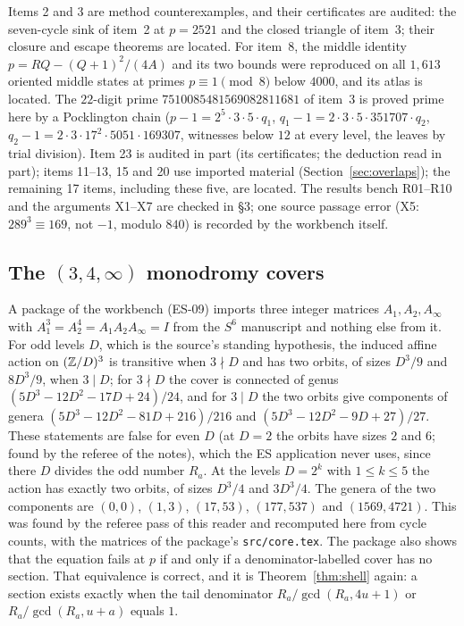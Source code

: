 Items 2 and 3 are method counterexamples, and their certificates are audited: the seven-cycle sink of item~2 at $p=2521$ and the closed triangle of item~3; their closure and escape theorems are located. For item~8, the middle identity $p=RQ-(Q+1)^2/(4A)$ and its two bounds were reproduced on all $1{,}613$ oriented middle states at primes $p\equiv1\pmod8$ below $4000$, and its atlas is located. The $22$-digit prime $7510085481569082811681$ of item~3 is proved prime here by a Pocklington chain ($p-1=2^5\cdot3\cdot5\cdot q_1$, $q_1-1=2\cdot3\cdot5\cdot351707\cdot q_2$, $q_2-1=2\cdot3\cdot17^2\cdot5051\cdot169307$, witnesses below $12$ at every level, the leaves by trial division). Item 23 is audited in part (its certificates; the deduction read in part); items 11--13, 15 and 20 use imported material (Section~\ref{sec:overlaps}); the remaining 17 items, including these five, are located. The results bench R01--R10 and the arguments X1--X7 are checked in  §3; one source passage error (X5: $289^3\equiv169$, not $-1$, modulo $840$) is recorded by the workbench itself.

\subsection{The \texorpdfstring{$(3,4,\infty)$}{(3,4,infinity)} monodromy covers}\label{ssec:es-s6}

A package of the workbench (ES-09) imports three integer matrices $A_1,A_2,A_\infty$ with $A_1^3=A_2^4=A_1A_2A_\infty=I$ from the $S^6$ manuscript \cite{AlpogeS6} and nothing else from it.
For odd levels $D$, which is the source's standing hypothesis, the induced affine action on $(\mathbb{Z}/D)^3$ is transitive when $3\nmid D$ and has two orbits, of sizes $D^3/9$ and $8D^3/9$, when $3\mid D$; for $3\nmid D$ the cover is connected of genus $(5D^3-12D^2-17D+24)/24$, and for $3\mid D$ the two orbits give components of genera $(5D^3-12D^2-81D+216)/216$ and $(5D^3-12D^2-9D+27)/27$.
These statements are false for even $D$ (at $D=2$ the orbits have sizes $2$ and $6$; found by the referee of the notes), which the ES application never uses, since there $D$ divides the odd number $R_a$. At the levels $D=2^k$ with $1\le k\le5$ the action has exactly two orbits, of sizes $D^3/4$ and $3D^3/4$. The genera of the two components are $(0,0)$, $(1,3)$, $(17,53)$, $(177,537)$ and $(1569,4721)$. This was found by the referee pass of this reader and recomputed here from cycle counts, with the matrices of the package's \texttt{src/core.tex}.
The package also shows that the equation fails at $p$ if and only if a denominator-labelled cover has no section. That equivalence is correct, and it is Theorem~\ref{thm:shell} again: a section exists exactly when the tail denominator $R_a/\gcd(R_a,4u+1)$ or $R_a/\gcd(R_a,u+a)$ equals $1$.


